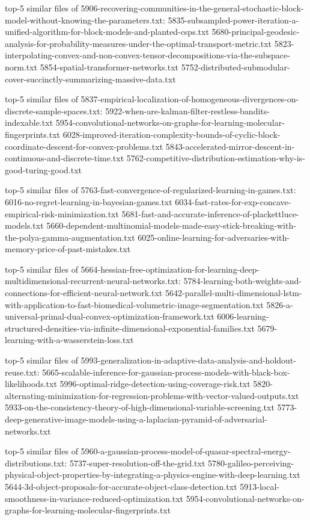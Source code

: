 \documentclass[11pt]{article}
\begin{document}
top-5 similar files of
5906-recovering-communities-in-the-general-stochastic-block-model-without-knowing-the-parameters.txt:
5835-subsampled-power-iteration-a-unified-algorithm-for-block-models-and-planted-csps.txt
5680-principal-geodesic-analysis-for-probability-measures-under-the-optimal-transport-metric.txt
5823-interpolating-convex-and-non-convex-tensor-decompositions-via-the-subspace-norm.txt
5854-spatial-transformer-networks.txt
5752-distributed-submodular-cover-succinctly-summarizing-massive-data.txt

top-5 similar files of
5837-empirical-localization-of-homogeneous-divergences-on-discrete-sample-spaces.txt:
5922-when-are-kalman-filter-restless-bandits-indexable.txt
5954-convolutional-networks-on-graphs-for-learning-molecular-fingerprints.txt
6028-improved-iteration-complexity-bounds-of-cyclic-block-coordinate-descent-for-convex-problems.txt
5843-accelerated-mirror-descent-in-continuous-and-discrete-time.txt
5762-competitive-distribution-estimation-why-is-good-turing-good.txt

top-5 similar files of
5763-fast-convergence-of-regularized-learning-in-games.txt:
6016-no-regret-learning-in-bayesian-games.txt
6034-fast-rates-for-exp-concave-empirical-risk-minimization.txt
5681-fast-and-accurate-inference-of-plackettluce-models.txt
5660-dependent-multinomial-models-made-easy-stick-breaking-with-the-polya-gamma-augmentation.txt
6025-online-learning-for-adversaries-with-memory-price-of-past-mistakes.txt

top-5 similar files of
5664-hessian-free-optimization-for-learning-deep-multidimensional-recurrent-neural-networks.txt:
5784-learning-both-weights-and-connections-for-efficient-neural-network.txt
5642-parallel-multi-dimensional-lstm-with-application-to-fast-biomedical-volumetric-image-segmentation.txt
5826-a-universal-primal-dual-convex-optimization-framework.txt
6006-learning-structured-densities-via-infinite-dimensional-exponential-families.txt
5679-learning-with-a-wasserstein-loss.txt

top-5 similar files of
5993-generalization-in-adaptive-data-analysis-and-holdout-reuse.txt:
5665-scalable-inference-for-gaussian-process-models-with-black-box-likelihoods.txt
5996-optimal-ridge-detection-using-coverage-risk.txt
5820-alternating-minimization-for-regression-problems-with-vector-valued-outputs.txt
5933-on-the-consistency-theory-of-high-dimensional-variable-screening.txt
5773-deep-generative-image-models-using-a-laplacian-pyramid-of-adversarial-networks.txt

top-5 similar files of
5960-a-gaussian-process-model-of-quasar-spectral-energy-distributions.txt:
5737-super-resolution-off-the-grid.txt
5780-galileo-perceiving-physical-object-properties-by-integrating-a-physics-engine-with-deep-learning.txt
5644-3d-object-proposals-for-accurate-object-class-detection.txt
5913-local-smoothness-in-variance-reduced-optimization.txt
5954-convolutional-networks-on-graphs-for-learning-molecular-fingerprints.txt
\end{document}
